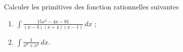
\begin{exercice}\label{exoanalyseCTU-0105}

Calculer les primitives des fonction rationnelles suivantes

\begin{multicols}{2}
  \begin{enumerate}
  \item $\displaystyle \int \frac{15x^2-4x-81}{(x-3)(x+4)(x-1)}\, dx$ ;
  \item $\displaystyle \int \frac{1}{x^6+x^4}\, dx$.
  \end{enumerate}
\end{multicols}

\end{exercice}



